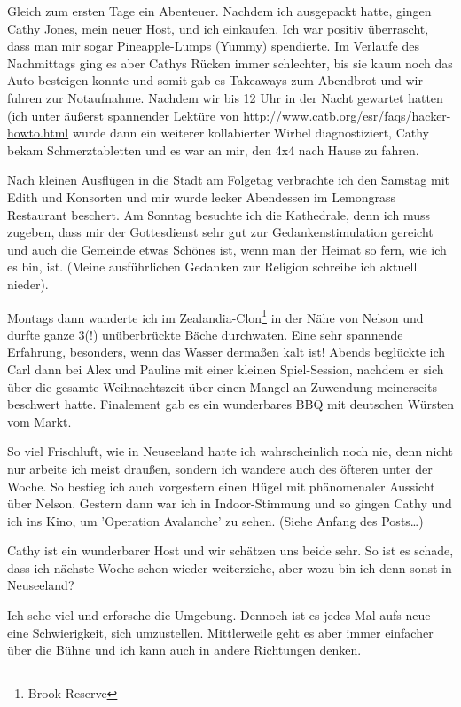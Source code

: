 Gleich zum ersten Tage ein Abenteuer. Nachdem ich ausgepackt hatte,
gingen Cathy Jones, mein neuer Host, und ich einkaufen. Ich war positiv
überrascht, dass man mir sogar Pineapple-Lumps (Yummy) spendierte. Im
Verlaufe des Nachmittags ging es aber Cathys Rücken immer schlechter,
bis sie kaum noch das Auto besteigen konnte und somit gab es Takeaways
zum Abendbrot und wir fuhren zur Notaufnahme. Nachdem wir bis 12 Uhr in
der Nacht gewartet hatten (ich unter äußerst spannender Lektüre von
\url{http://www.catb.org/esr/faqs/hacker-howto.html}
wurde dann ein weiterer kollabierter Wirbel diagnostiziert, Cathy bekam
Schmerztabletten und es war an mir, den 4x4 nach Hause zu fahren.

Nach kleinen Ausflügen in die Stadt am Folgetag verbrachte ich den
Samstag mit Edith und Konsorten und mir wurde lecker Abendessen im
Lemongrass Restaurant beschert. Am Sonntag besuchte ich die Kathedrale,
denn ich muss zugeben, dass mir der Gottesdienst sehr gut zur
Gedankenstimulation gereicht und auch die Gemeinde etwas Schönes ist,
wenn man der Heimat so fern, wie ich es bin, ist. (Meine ausführlichen
Gedanken zur Religion schreibe ich aktuell nieder).

Montags dann wanderte ich im Zealandia-Clon\footnote{Brook Reserve} in
der Nähe von Nelson und durfte ganze 3(!) unüberbrückte Bäche
durchwaten. Eine sehr spannende Erfahrung, besonders, wenn das Wasser
dermaßen kalt ist! Abends beglückte ich Carl dann bei Alex und Pauline
mit einer kleinen Spiel-Session, nachdem er sich über die gesamte
Weihnachtszeit über einen Mangel an Zuwendung meinerseits beschwert
hatte. Finalement gab es ein wunderbares BBQ mit deutschen Würsten vom
Markt.

So viel Frischluft, wie in Neuseeland hatte ich wahrscheinlich noch nie,
denn nicht nur arbeite ich meist draußen, sondern ich wandere auch des
öfteren unter der Woche. So bestieg ich auch vorgestern einen Hügel mit
phänomenaler Aussicht über Nelson. Gestern dann war ich in
Indoor-Stimmung und so gingen Cathy und ich ins Kino, um 'Operation
Avalanche' zu sehen. (Siehe Anfang des Posts\ldots)

Cathy ist ein wunderbarer Host und wir schätzen uns beide sehr. So ist
es schade, dass ich nächste Woche schon wieder weiterziehe, aber wozu
bin ich denn sonst in Neuseeland?

Ich sehe viel und erforsche die Umgebung. Dennoch ist es jedes Mal aufs
neue eine Schwierigkeit, sich umzustellen. Mittlerweile geht es aber
immer einfacher über die Bühne und ich kann auch in andere Richtungen
denken.


